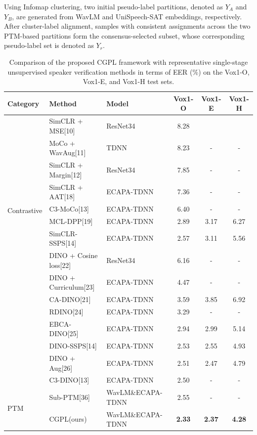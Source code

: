 \documentclass[journal]{IEEEtran}
\begin{document}
Using Infomap clustering, two initial pseudo-label partitions, denoted as $Y_A$ and $Y_B$, are generated from WavLM and UniSpeech-SAT embeddings, respectively. After cluster-label alignment, samples with consistent assignments across the two PTM-based partitions form the consensus-selected subset, whose corresponding pseudo-label set is denoted as $Y_r$.

\begin{table}[!t] %
    \centering
   \caption{Comparison of the proposed CGPL framework with representative single-stage unsupervised speaker verification methods in terms of EER (\%) on the Vox1-O, Vox1-E, and Vox1-H test sets.} 
    \setlength{\tabcolsep}{10pt} 
    \begin{tabular}{l l l  c c c} 
        \hline
        Category & Method  & Model   & Vox1-O & Vox1-E & Vox1-H  \\
        \hline
        \multirow{10}{*}{Contrastive}
        &SimCLR + MSE[10] & ResNet34 & 8.28 &  &    \\
        &MoCo + WavAug[11]& TDNN & 8.23 &-  &-    \\
        &SimCLR + Margin[12]& ResNet34 & 7.85 & - &  -  \\
        &SimCLR + AAT[18]& ECAPA-TDNN & 7.36 & - & -   \\
        &C3-MoCo[13]& ECAPA-TDNN & 6.40 &-  & -   \\
        &MCL-DPP[19]& ECAPA-TDNN & 2.89 & 3.17 & 6.27   \\
        &SimCLR-SSPS[14]& ECAPA-TDNN & 2.57 &3.11  & 5.56   \\
        \hline
        \multirow{9}{*}{Self-distillation}
        &DINO + Cosine loss[22]&ResNet34&  6.16 & - & -   \\
        &DINO + Curriculum[23]&ECAPA-TDNN&  4.47 & - & -   \\
        &CA-DINO[21]&ECAPA-TDNN& 3.59 & 3.85 &  6.92  \\
        &RDINO[24]&ECAPA-TDNN& 3.29 & - & -   \\
        &EBCA-DINO[25]&ECAPA-TDNN& 2.94 &2.99  &  5.14  \\
        &DINO-SSPS[14]&ECAPA-TDNN& 2.53 &2.55  &  4.93  \\
        &DINO + Aug[26]&ECAPA-TDNN& 2.51 &2.47  &  4.79  \\
        &C3-DINO[13]&ECAPA-TDNN& 2.50& - &-    \\
        \hline
        \multirow{2}{*}{PTM}
        &Sub-PTM[36]&WavLM\&ECAPA-TDNN& 2.55& - &-    \\
        &CGPL(ours) & WavLM\&ECAPA-TDNN  & \textbf{2.33} & \textbf{2.37} & \textbf{4.28}   \\
        \hline
    \end{tabular}
    \label{tab:single-stage comparison}
\end{table}
\FloatBarrier 
\end{document}
